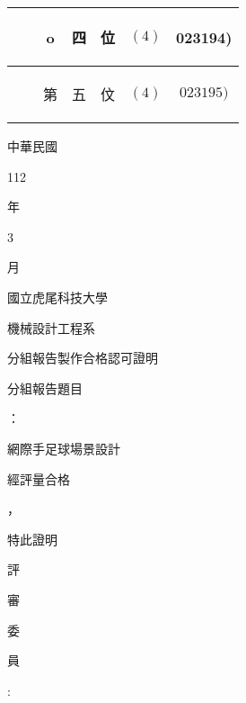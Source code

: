 \documentclass[10pt]{article}
\begin{document}
\begin{center}
\begin{tabular}{|c|c|c|c|c|c|c|}
\hline
 &  & o & \begin{CJK}{UTF8}{mj}四\end{CJK} & \begin{CJK}{UTF8}{mj}位\end{CJK} & $(4)$ & 023194) \\
\hline
 &  & \begin{CJK}{UTF8}{mj}第\end{CJK} & \begin{CJK}{UTF8}{mj}五\end{CJK} & \begin{CJK}{UTF8}{mj}伩\end{CJK} & $(4)$ & $023195)$ \\
\hline
\end{tabular}
\end{center}

\begin{CJK}{UTF8}{mj}中華民國\end{CJK}

112 \begin{CJK}{UTF8}{mj}年\end{CJK} 3 \begin{CJK}{UTF8}{mj}月\end{CJK} \begin{CJK}{UTF8}{mj}國立虎尾科技大學\end{CJK} \begin{CJK}{UTF8}{mj}機械設計工程系\end{CJK} \begin{CJK}{UTF8}{mj}分組報告製作合格認可證明\end{CJK}

\begin{CJK}{UTF8}{mj}分組報告題目\end{CJK}：\begin{CJK}{UTF8}{mj}網際手足球場景設計\end{CJK}

\begin{CJK}{UTF8}{mj}經評量合格\end{CJK}，\begin{CJK}{UTF8}{mj}特此證明\end{CJK}

\begin{CJK}{UTF8}{mj}評\end{CJK} \begin{CJK}{UTF8}{mj}審\end{CJK} \begin{CJK}{UTF8}{mj}委\end{CJK} \begin{CJK}{UTF8}{mj}員\end{CJK} :
\end{document}
